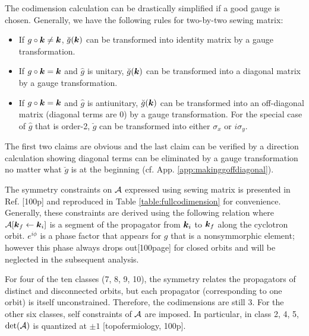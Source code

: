 \documentclass[aps, prb, showpacs, twocolumn, notitlepage, superscriptaddress]{revtex4-1}
\begin{document}
The codimension calculation can be drastically simplified if a good gauge is chosen. Generally, we have the following rules for two-by-two sewing matrix:
\begin{itemize}
\item If $g\circ\boldsymbol{k}\ne\boldsymbol{k}$, $\breve{g}(\boldsymbol{k})$ can be transformed into identity matrix by a gauge transformation.
\item If $g\circ\boldsymbol{k}=\boldsymbol{k}$ and $\hat{g}$ is unitary, $\breve{g}(\boldsymbol{k})$ can be transformed into a diagonal matrix by a gauge transformation.
\item If $g\circ\boldsymbol{k}=\boldsymbol{k}$ and $\hat{g}$ is antiunitary, $\breve{g}(\boldsymbol{k})$ can be transformed into an off-diagonal matrix (diagonal terms are 0) by a gauge transformation.  For the special case of $\hat{g}$ that is order-2, $\breve{g}$ can be transformed into either $\sigma_x$  or $i\sigma_y$.
\end{itemize}
The first two claims are obvious and the last claim can be verified by a direction calculation showing diagonal terms can be eliminated by a gauge transformation no matter what $\breve{g}$ is at the beginning (cf. App. \ref{app:makinggoffdiagonal}).

The symmetry constraints on ${\cal A}$ expressed using sewing matrix is presented in Ref. [100p] and reproduced in Table \ref{table:fullcodimension} for convenience. Generally, these constraints are derived using the following relation
where ${\cal A}[\boldsymbol{k}_f\leftarrow \boldsymbol{k}_i]$ is a segment of the propagator from $\boldsymbol{k}_i$ to $\boldsymbol{k}_f$ along the cyclotron orbit. $e^{i\phi}$ is a phase factor that appears for $g$ that is a nonsymmorphic element; however this phase always drops out[100page] for closed orbits and will be neglected in the subsequent analysis.

For four of  the ten classes (7, 8, 9, 10), the symmetry relates the propagators of distinct and disconnected orbits, but each propagator (corresponding to one orbit) is itself unconstrained.  Therefore, the codimensions are still 3. For the other six classes, self constraints of ${\cal A}$ are imposed. In particular, in class 2, 4, 5, $\det({\cal A})$ is quantized at $\pm 1$ [topofermiology, 100p].
\end{document}
